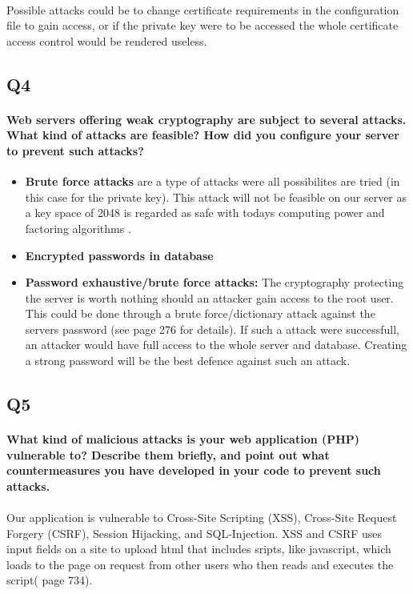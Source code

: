 \documentclass[a4paper,11pt]{article}
\begin{document}
\paragraph{}Possible attacks could be to change certificate requirements in the configuration file to gain access, or if the private key were to be accessed the whole certificate access control would be rendered useless.
\subsection{Q4}
\paragraph{Web servers offering weak cryptography are subject to several attacks. What kind of attacks are feasible? How did you conﬁgure your server to prevent such attacks?}
\begin{itemize}
	\item \textbf{Brute force attacks} are a type of attacks were all possibilites are tried (in this case for the private key). This attack will not be feasible on our server as a key space of 2048 is regarded as safe with todays computing power and factoring algorithms \cite{5}.
	\item \textbf{Encrypted passwords in database} 
	\item \textbf{Password exhaustive/brute force attacks:} The cryptography protecting the server is worth nothing should an attacker gain access to the root user. This could be done through a brute force/dictionary attack against the servers password (see \cite{6} page  276 for details). If such a attack were successfull, an attacker would have full access to the whole server and database. Creating a strong password will be the best defence against such an attack.
\end{itemize}
\subsection{Q5}
\paragraph{What kind of malicious attacks is your web application (PHP) vulnerable to? Describe
them brieﬂy, and point out what countermeasures you have developed in your code to prevent
such attacks.}
\paragraph{}Our application is vulnerable to Cross-Site Scripting (XSS), Cross-Site Request Forgery (CSRF), Session Hijacking, and SQL-Injection. XSS and CSRF uses input fields on a site to upload html that includes sripts, like javascript, which loads to the page on request from other users who then reads and executes the script(\cite{8} page 734).
\end{document}
